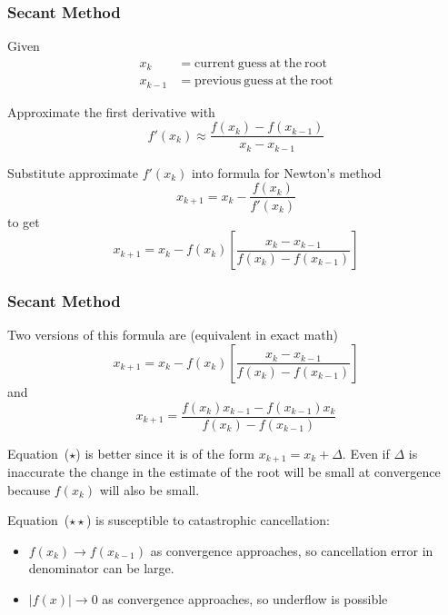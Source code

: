 \documentclass[10pt]{beamer}
\begin{document}
\begin{frame}
\frametitle{Secant Method}

Given
\begin{align*}
    x_k     &= \mathrm{current\ guess\ at\ the\ root}\\
    x_{k-1} &= \mathrm{previous\ guess\ at\ the\ root}
\end{align*}

Approximate the first derivative with
\begin{equation*}
    f'(x_k) \approx \frac{f(x_k) - f(x_{k-1})}{x_k - x_{k-1}}
\end{equation*}

Substitute approximate $f'(x_k)$ into formula for Newton's method
\begin{equation*}
    x_{k+1} = x_k - \frac{f(x_k)}{f'(x_k)}
\end{equation*}
to get
\begin{equation*}
    x_{k+1} = x_k - f(x_k) \left[ \frac{x_k - x_{k-1}}{f(x_k) - f(x_{k-1})} \right]
\end{equation*}



\end{frame}
\begin{frame}
\frametitle{Secant Method}

\vspace{3ex}
Two versions of this formula are (equivalent in exact math)
\begin{equation*}
    x_{k+1} = x_k - f(x_k) \left[ \frac{x_k - x_{k-1}}{f(x_k) - f(x_{k-1})} \right]  \tag{$\star$}
\end{equation*}
and
\begin{equation*}
    x_{k+1} = \frac{f(x_k) x_{k-1} - f(x_{k-1}) x_k}{f(x_k) - f(x_{k-1})}  \tag{$\star\star$}
\end{equation*}

Equation~($\star$) is better since it is of the form $x_{k+1} = x_k + \Delta$.
Even if $\Delta$ is inaccurate the change in the estimate of the
root will be small at convergence because $f(x_k)$ will also
be small.

Equation~($\star\star$) is susceptible to catastrophic cancellation:
\vspace{0.0cm}
\begin{itemize}
    \item   $f(x_k)\rightarrow f(x_{k-1})$ as convergence approaches,
            so cancellation error in denominator can be large.
    \item   $|f(x)|\rightarrow 0$ as convergence approaches,
            so underflow is possible
\end{itemize}



\end{frame}
\end{document}
